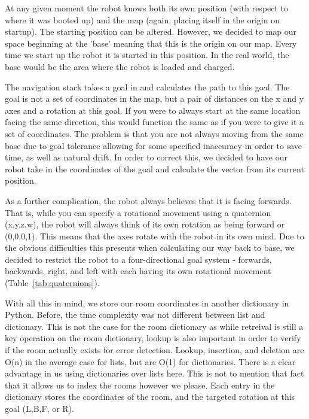 \documentclass{article}
\begin{document}
At any given moment the robot knows both its own position (with respect to where it was booted up) and the map (again, placing itself in the origin on startup). The starting position can be altered. However, we decided to map our space beginning at the 'base' meaning that this is the origin on our map. Every time we start up the robot it is started in this position. In the real world, the base would be the area where the robot is loaded and charged.

The navigation stack takes a goal in and calculates the path to this goal. The goal is not a set of coordinates in the map, but a pair of distances on the x and y axes and a rotation at this goal. If you were to always start at the same location facing the same direction, this would function the same as if you were to give it a set of coordinates. The problem is that you are not always moving from the same base due to goal tolerance allowing for some specified inaccuracy in order to save time, as well as natural drift. In order to correct this, we decided to have our robot take in the coordinates of the goal and calculate the vector from its current position.

As a further complication, the robot always believes that it is facing forwards. That is, while you can specify a rotational movement using a quaternion (x,y,z,w), the robot will always think of its own rotation as being forward or (0,0,0,1). This means that the axes rotate with the robot in its own mind. Due to the obvious difficulties this presents when calculating our way back to base, we decided to restrict the robot to a four-directional goal system - forwards, backwards, right, and left with each having its own rotational movement (Table~\ref{tab:quaternions}).

With all this in mind, we store our room coordinates in another dictionary in Python. Before, the time complexity was not different between list and dictionary. This is not the case for the room dictionary as while retreival is still a key operation on the room dictionary, lookup is also important in order to verify if the room actually exists for error detection. Lookup, insertion, and deletion are O(n) in the average case for lists, but are O(1) for dictionaries. There is a clear advantage in us using dictionaries over lists here. This is not to mention that fact that it allows us to index the rooms however we please. Each entry in the dictionary stores the coordinates of the room, and the targeted rotation at this goal (L,B,F, or R).
\end{document}

